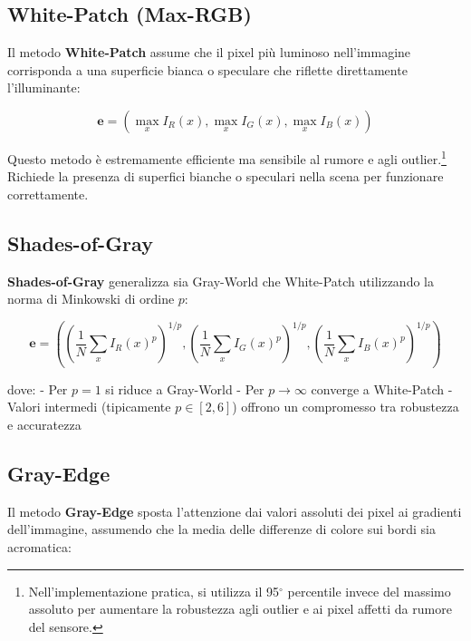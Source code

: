 \subsection{White-Patch (Max-RGB)}

Il metodo \textbf{White-Patch} \cite{zapryanov_automatic_2012} assume che il pixel più luminoso nell'immagine corrisponda a una superficie bianca o speculare che riflette direttamente l'illuminante:

\begin{equation}
\mathbf{e} = \left( \max_x I_R(x), \max_x I_G(x), \max_x I_B(x) \right)
\label{eq:white_patch}
\end{equation}

Questo metodo è estremamente efficiente ma sensibile al rumore e agli outlier.\footnote{Nell'implementazione pratica, si utilizza il 95$^\circ$ percentile invece del massimo assoluto per aumentare la robustezza agli outlier e ai pixel affetti da rumore del sensore.} Richiede la presenza di superfici bianche o speculari nella scena per funzionare correttamente.

\subsection{Shades-of-Gray}

\textbf{Shades-of-Gray} \cite{zapryanov_automatic_2012} generalizza sia Gray-World che White-Patch utilizzando la norma di Minkowski di ordine $p$:

\begin{equation}
\mathbf{e} = \left( \left( \frac{1}{N} \sum_{x} I_R(x)^p \right)^{1/p}, \left( \frac{1}{N} \sum_{x} I_G(x)^p \right)^{1/p}, \left( \frac{1}{N} \sum_{x} I_B(x)^p \right)^{1/p} \right)
\label{eq:shades_of_gray}
\end{equation}

dove:
- Per $p = 1$ si riduce a Gray-World
- Per $p \to \infty$ converge a White-Patch
- Valori intermedi (tipicamente $p \in [2, 6]$) offrono un compromesso tra robustezza e accuratezza

\subsection{Gray-Edge}

Il metodo \textbf{Gray-Edge} \cite{van_de_weijer_edge-based_2007} sposta l'attenzione dai valori assoluti dei pixel ai gradienti dell'immagine, assumendo che la media delle differenze di colore sui bordi sia acromatica:

